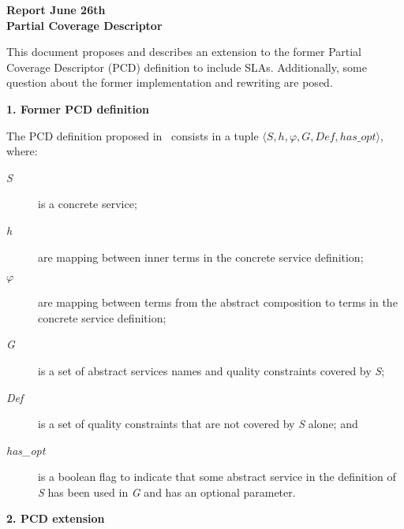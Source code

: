 \documentclass[12pt,a4paper,oneside]{report}
\begin{document}
\begin{center}
\textbf{\large{Report June 26th}} \\
\textbf{\large{Partial Coverage Descriptor}}
\end{center}

This document proposes and describes an extension to the former Partial Coverage Descriptor (PCD) definition to include SLAs. 
Additionally, some question about the former implementation and rewriting are posed. 

\bigskip

\begin{flushleft}
\textbf{1. Former PCD definition}
\end{flushleft}

The PCD definition proposed in~\cite{Umberto} consists in a tuple $\langle S, h, \varphi, G, Def, has\_opt\rangle$, where:
\begin{description}
\item[\textit{S}] is a concrete service;
\item[\textit{h}] are mapping between inner terms in the concrete service definition;
\item[\textit{$\varphi$}] are mapping between terms from the abstract composition to terms in the concrete service definition;
\item[\textit{G}] is a set of abstract services names and quality constraints covered by \textit{S};
\item[\textit{Def}] is a set of quality constraints that are not covered by \textit{S} alone; and
\item[\textit{has\_opt}] is a boolean flag to indicate that some abstract service in the definition of \textit{S} has been used in \textit{G} and has an optional parameter.
\end{description}

\begin{flushleft}
\textbf{2. PCD extension}
\end{flushleft}
\end{document}
